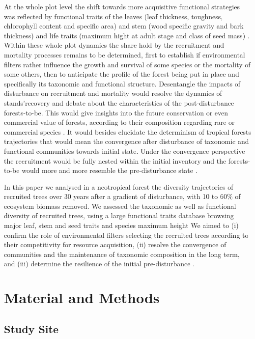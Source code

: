 \documentclass[fleqn,10pt]{ArtEcoFoG} %
\begin{document}
At the whole plot level the shift towards more acquisitive functional
strategies was reflected by functional traits of the leaves (leaf
thickness, toughness, chlorophyll content and specific area) and stem
(wood specific gravity and bark thickness) and life traits (maximum
hight at adult stage and class of seed mass)
\citep{Wright2004, Chave2009b, Herault2011}. Within these whole plot
dynamics the share hold by the recruitment and mortality processes
remains to be determined, first to establish if environmental filters
rather influence the growth and survival of some species or the
mortality of some others, then to anticipate the profile of the forest
being put in place and specifically its taxonomic and functional
structure. Desentangle the impacts of disturbance on recruitment and
mortality would resolve the dynamics of stands'recovery and debate about
the characteristics of the post-disturbance forests-to-be. This would
give insights into the future conservation or even commercial value of
forests, according to their composition regarding rare or commercial
species \citep{Diaz2005, Gardner2007, Schwartz2017}. It would besides
elucidate the determinism of tropical forests trajectories that would
mean the convergence after disturbance of taxonomic and functional
communities towards initial state. Under the convergence perspective the
recruitment would be fully nested within the initial inventory and the
forests-to-be would more and more resemble the pre-disturbance state
\citep{Meiners2015, Li2016}.

In this paper we analysed in a neotropical forest the diversity
trajectories of recruited trees over 30 years after a gradient of
disturbance, with 10 to 60\% of ecosystem biomass removed. We assessed
the taxonomic as well as functional diversity of recruited trees, using
a large functional traits database browsing major leaf, stem and seed
traits and species maximum height We aimed to (i) confirm the role of
environmental filters selecting the recruited trees according to their
competitivity for resource acquisition, (ii) resolve the convergence of
communities and the maintenance of taxonomic composition in the long
term, and (iii) determine the resilience of the initial pre-disturbance
.

\section{Material and Methods}\label{material-and-methods}

\subsection{Study Site}\label{study-site}
\end{document}
